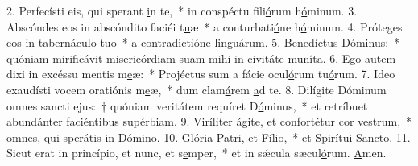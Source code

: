 2. Perfecísti eis, qui sperant \uline{i}n te,~* in conspéctu fili\uline{ó}rum h\uline{ó}minum.
3. Abscóndes eos in abscóndito faciéi t\uline{u}æ~* a conturbati\uline{ó}ne h\uline{ó}minum.
4. Próteges eos in tabernáculo t\uline{u}o~* a contradicti\uline{ó}ne lin\uline{guá}rum.
5. Benedíctus D\uline{ó}minus:~* quóniam mirificávit misericórdiam suam mihi in civit\uline{á}te mun\uline{í}ta.
6. Ego autem dixi in excéssu mentis m\uline{e}æ:~* Projéctus sum a fácie ocul\uline{ó}rum tu\uline{ó}rum.
7. Ideo exaudísti vocem oratiónis m\uline{e}æ,~* dum clam\uline{á}rem \uline{a}d te.
8. Dilígite Dóminum omnes sancti ejus:~† quóniam veritátem requíret D\uline{ó}minus,~* et retríbuet abundánter faciéntib\uline{u}s sup\uline{é}rbiam.
9. Viríliter ágite, et confortétur cor v\uline{e}strum,~* omnes, qui sper\uline{á}tis in D\uline{ó}mino.
10. Glória Patri, et F\uline{í}lio,~* et Spir\uline{í}tui S\uline{a}ncto.
11. Sicut erat in princípio, et nunc, et s\uline{e}mper,~* et in sǽcula sæcul\uline{ó}rum. \uline{A}men.
